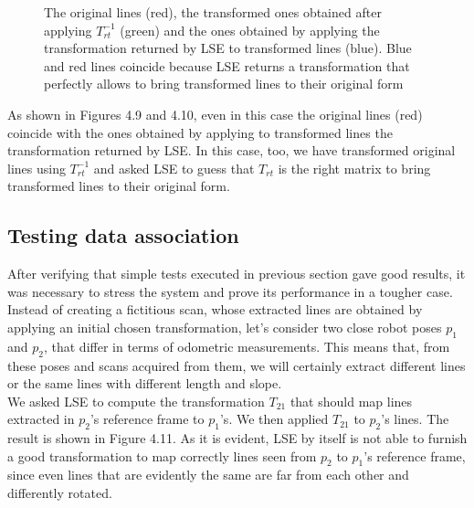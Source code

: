 \documentclass[a4paper, onecolumn]{report}
\begin{document}
\begin{figure}[htbp]
\centering
{}
\caption{The original lines (red), the transformed ones obtained after applying $T_{rt}^{-1}$ (green) and the ones obtained by applying the transformation returned by LSE to transformed lines (blue). Blue and red lines coincide because LSE returns a transformation that perfectly allows to bring transformed lines to their original form}
\end{figure}
As shown in Figures 4.9 and 4.10, even in this case the original lines (red) coincide with the ones obtained by applying to transformed lines the transformation returned by LSE. In this case, too, we have transformed original lines using $T_{rt}^{-1}$ and asked LSE to guess that $T_{rt}$ is the right matrix to bring transformed lines to their original form.

\subsection{Testing data association}
After verifying that simple tests executed in previous section gave good results, it was necessary to stress the system and prove its performance in a tougher case. Instead of creating a fictitious scan, whose extracted lines are obtained by applying an initial chosen transformation, let's consider two close robot poses $p_1$ and $p_2$, that differ in terms of odometric measurements. This means that, from these poses and scans acquired from them, we will certainly extract different lines or the same lines with different length and slope. \\ 
We asked LSE to compute the transformation $T_{21}$ that should map lines extracted in $p_2$'s reference frame to $p_1$'s. We then applied $T_{21}$ to $p_2$'s lines. The result is shown in Figure 4.11. As it is evident, LSE by itself is not able to furnish a good transformation to map correctly lines seen from $p_2$ to $p_1$'s reference frame, since even lines that are evidently the same are far from each other and differently rotated. 
\end{document}
